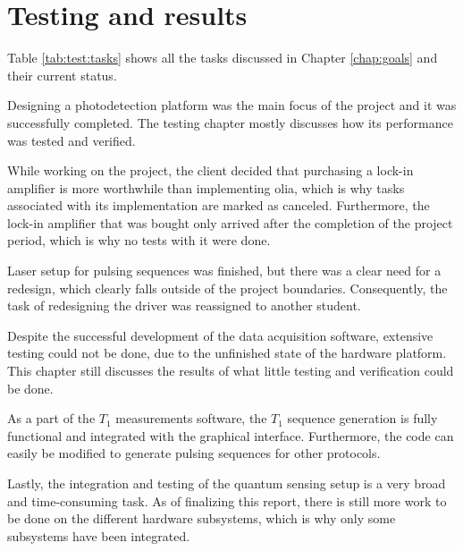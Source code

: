 \chapter{Testing and results}\label{chap:conclusion}

Table \ref{tab:test:tasks} shows all the tasks discussed in Chapter \ref{chap:goals} and their current status. 


Designing a photodetection platform was the main focus of the project and it was successfully completed. The testing chapter mostly discusses how its performance was tested and verified. 

While working on the project, the client decided that purchasing a lock-in amplifier is more worthwhile than implementing \gls{olia}, which is why tasks associated with its implementation are marked as canceled. Furthermore, the lock-in amplifier that was bought only arrived after the completion of the project period, which is why no tests with it were done. 

Laser setup for pulsing sequences was finished, but there was a clear need for a redesign, which clearly falls outside of the project boundaries. Consequently, the task of redesigning the driver was reassigned to another student. 

Despite the successful development of the data acquisition software, extensive testing could not be done, due to the unfinished state of the hardware platform. This chapter still discusses the results of what little testing and verification could be done. 

As a part of the $T_1$ measurements software, the $T_1$ sequence generation is fully functional and integrated with the graphical interface. Furthermore, the code can easily be modified to generate pulsing sequences for other protocols. 

Lastly, the integration and testing of the quantum sensing setup is a very broad and time-consuming task. As of finalizing this report, there is still more work to be done on the different hardware subsystems, which is why only some subsystems have been integrated.



